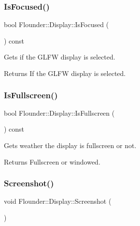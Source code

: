 \subsubsection{\texorpdfstring{Is\+Focused()}{IsFocused()}}
{\footnotesize\ttfamily bool Flounder\+::\+Display\+::\+Is\+Focused (\begin{DoxyParamCaption}{ }\end{DoxyParamCaption}) const\hspace{0.3cm}{\ttfamily [inline]}}



Gets if the G\+L\+FW display is selected. 

\begin{DoxyReturn}{Returns}
If the G\+L\+FW display is selected. 
\end{DoxyReturn}
\mbox{\label{class_flounder_1_1_display_a58b67f3dc5531fc75846328e7c19bfa3}} 
\subsubsection{\texorpdfstring{Is\+Fullscreen()}{IsFullscreen()}}
{\footnotesize\ttfamily bool Flounder\+::\+Display\+::\+Is\+Fullscreen (\begin{DoxyParamCaption}{ }\end{DoxyParamCaption}) const\hspace{0.3cm}{\ttfamily [inline]}}



Gets weather the display is fullscreen or not. 

\begin{DoxyReturn}{Returns}
Fullscreen or windowed. 
\end{DoxyReturn}
\mbox{\label{class_flounder_1_1_display_a67b31b74e1b328a179ff5561b61730ac}} 
\subsubsection{\texorpdfstring{Screenshot()}{Screenshot()}}
{\footnotesize\ttfamily void Flounder\+::\+Display\+::\+Screenshot (\begin{DoxyParamCaption}{ }\end{DoxyParamCaption})}



